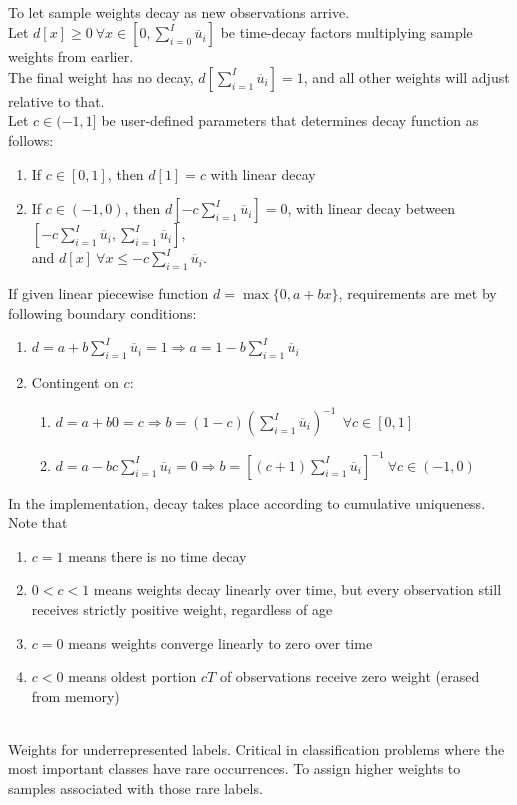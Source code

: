 \begin{method}  \\
To let sample weights decay as new observations arrive.\\
Let $d[x] \geq 0 \ \forall x \in [0, \sum_{i=0}^I \overline{u}_i]$ be time-decay factors multiplying sample weights from earlier.\\
The final weight has no decay, $d[\sum_{i=1}^I \overline{u}_i] = 1$, and all other weights will adjust relative to that.\\
Let $c \in (-1, 1]$ be user-defined parameters that determines decay function as follows:
\begin{enumerate}[label=\roman*.]
\setlength{\itemsep}{0pt}
\item If $c \in [0,1]$, then $d[1] = c$ with linear decay
\item If $c \in (-1, 0)$, then $d[-c \sum_{i=1}^I \overline{u}_i] = 0$, with linear decay between $[-c \sum_{i=1}^I \overline{u}_i, \sum_{i=1}^I \overline{u}_i]$,\\
and $d[x] \ \forall x \leq -c \sum_{i=1}^I \overline{u}_i$.
\end{enumerate}
If given linear piecewise function $d = \max \{0, a + bx\}$, requirements are met by following boundary conditions:
\begin{enumerate}[label=\roman*.]
\setlength{\itemsep}{0pt}
\item $d = a + b \sum_{i=1}^I \overline{u}_i = 1 \Rightarrow a = 1 - b \sum_{i=1}^I \overline{u}_i$
\item Contingent on $c$:
\begin{enumerate}[label=\arabic*.]
\setlength{\itemsep}{0pt}
\item $d = a + b0 = c \Rightarrow b = (1-c) (\sum_{i=1}^I \overline{u}_i)^{-1} \ \ \forall c \in [0,1]$
\item $d = a - bc \sum_{i=1}^I \overline{u}_i = 0 \Rightarrow b = [(c+1) \sum_{i=1}^I \overline{u}_i]^{-1} \ \forall c \in (-1, 0)$
\end{enumerate}
\end{enumerate}
In the implementation, decay takes place according to cumulative uniqueness. Note that
\begin{enumerate}[label=\roman*.]
\setlength{\itemsep}{0pt}
\item $c=1$ means there is no time decay
\item $0 < c < 1$ means weights decay linearly over time, but every observation still receives strictly positive weight, regardless of age
\item $c = 0$ means weights converge linearly to zero over time
\item $c < 0$ means oldest portion $cT$ of observations receive zero weight (erased from memory)
\end{enumerate}
\end{method}

\begin{method} \\
Weights for underrepresented labels. Critical in classification problems where the most important classes have rare occurrences. To assign higher weights to samples associated with those rare labels.
\end{method}